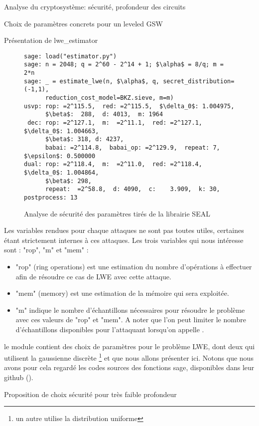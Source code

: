 \begin{section}{Analyse du cryptosystème: sécurité, profondeur des circuits}
\begin{subsection}{Choix de paramètres concrets pour un leveled GSW}
\begin{subsubsection}{Présentation de lwe\_estimator}
	\begin{figure}
	\label{fig:seal_estimate}
	\begin{lstlisting}[mathescape=true]
sage: load("estimator.py")
sage: n = 2048; q = 2^60 - 2^14 + 1; $\alpha$ = 8/q; m = 2*n
sage: _ = estimate_lwe(n, $\alpha$, q, secret_distribution=(-1,1), 
	  reduction_cost_model=BKZ.sieve, m=m)
usvp: rop: =2^115.5,  red: =2^115.5,  $\delta_0$: 1.004975,  
      $\beta$:  288,  d: 4013,  m: 1964
 dec: rop: =2^127.1,  m:  =2^11.1,  red: =2^127.1,  $\delta_0$: 1.004663,  
      $\beta$: 318, d: 4237,  
      babai: =2^114.8,  babai_op: =2^129.9,  repeat: 7,  $\epsilon$: 0.500000
dual: rop: =2^118.4,  m:  =2^11.0,  red: =2^118.4,  $\delta_0$: 1.004864,  
      $\beta$: 298,  
      repeat:  =2^58.8,  d: 4090,  c:    3.909,  k: 30, postprocess: 13
	\end{lstlisting}
	\caption{Analyse de sécurité des paramètres tirés de la librairie SEAL}
	\end{figure}
	\flushleft
	
	Les variables rendues pour chaque attaques ne sont pas toutes utiles, certaines étant strictement internes à ces attaques. Les trois variables qui nous intéresse sont : "rop", "m" et "mem" :
	
	\begin{itemize}
	\item "rop" (ring operations) est une estimation du nombre d'opérations à effectuer afin de résoudre ce cas de LWE avec cette attaque.
	
	\item "mem" (memory) est une estimation de la mémoire qui sera exploitée.
	
	\item "m" indique le nombre d'échantillons nécessaires pour résoudre le problème avec ces valeurs de
	"rop" et "mem". A noter que l'on peut limiter le nombre d'échantillons disponibles pour l'attaquant
	lorsqu'on appelle .
	\end{itemize}

	le module  contient des choix de paramètres pour
	le problème LWE, dont deux qui utilisent la gaussienne discrète
	\footnote{un autre utilise la distribution uniforme}
	et que nous allons présenter ici. Notons que nous avons pour cela 
	regardé les codes 
	sources des fonctions sage, disponibles dans leur github (\cite{sage}).
	\end{subsubsection}

	\begin{subsubsection}{Proposition de choix sécurité pour très faible profondeur}

\end{subsubsection}
\end{subsection}
\end{section}
